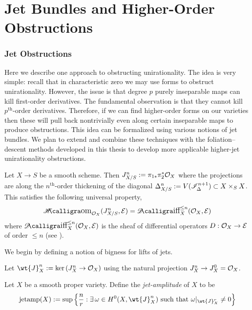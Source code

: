 \documentclass[main.tex]{subfiles}
\begin{document}
\chapter{Jet Bundles and Higher-Order Obstructions} \label{chapter:jets}


\subsection{Jet Obstructions}


Here we describe one approach to obstructing unirationality. The idea is very simple: recall that in characteristic zero we may use forms to obstruct unirationality. However, the issue is that degree $p$ purely inseparable maps can kill first-order derivatives. The fundamental observation is that they cannot kill $p^{\text{th}}$-order derivatives. Therefore, if we can find higher-order forms on our varieties then these will pull back nontrivially even along certain inseparable maps to produce obstructions. This idea can be formalized using various notions of jet bundles. We plan to extend and combine these techniques with the foliation--descent methods developed in this thesis to develop more applicable higher-jet unirationality obstructions. 

\begin{defn}
Let $X \to S$ be a smooth scheme. Then $J^n_{X/S} := \pi_{1*} \pi_2^* \mathcal{O}_{X}$ where the projections are along the $n^{\text{th}}$-order thickening of the diagonal $\Delta^n_{X/S} := V(\mathscr{I}_{\Delta}^{n+1}) \subset X \times_S X$. This satisfies the following universal property,
\[ \shHom_{\struct{X}}(J^n_{X/S},\E) = \shDiff^{\le n}_{X}(\struct{X}, \E) \]
where $\shDiff^{\le n}_{X}(\struct{X}, \E)$ is the sheaf of differential operators $D : \mathcal{O}_X \to \mathcal{E}$ of order $\le n$ (see \cite[IV$_4$, \S~16.8]{EGAIV}).
\end{defn}

We begin by defining a notion of bigness for lifts of jets.

\begin{defn}
Let $\wt{J}^n_X := \ker{(J^n_X \to \struct{X})}$ using the natural projection $J^n_X \to J^0_X = \mathcal{O}_{X}$.
\end{defn}

\begin{defn}
Let $X$ be a smooth proper variety. Define the \textit{jet-amplitude} of $X$ to be
\[ \jetamp(X) := \sup \left\{ \frac{n}{r} : \exists \, \omega \in H^0(X, \wt{J}^{n}_X) \text{ such that } \omega|_{\wt{J}^{r}_X} \neq 0 \right\} \]
\end{defn}
\end{document}
